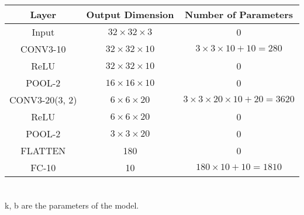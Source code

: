 \documentclass[11pt]{scrartcl} %
\begin{document}
\section{} %
\begin{table}[h]
\centering
\begin{tabular}{|c|c|c|}
\hline
Layer & Output Dimension & Number of Parameters\\
\hline
Input & $32 \times 32 \times 3$ & 0\\
\hline
CONV3-10 & $32 \times 32 \times 10$ & $3 \times 3 \times 10 + 10 = 280$\\
\hline
ReLU & $32 \times 32 \times 10$ & 0\\
\hline
POOL-2 & $16 \times 16 \times 10$ & 0\\
\hline
CONV3-20(3, 2) & $6 \times 6 \times 20$ & $3 \times 3 \times 20 \times 10 + 20 = 3620$\\
\hline
ReLU & $6 \times 6 \times 20$ & 0\\
\hline
POOL-2 & $3 \times 3 \times 20$ & 0\\
\hline
FLATTEN & 180 & 0\\
\hline
FC-10 & 10 & $180 \times 10 + 10 = 1810$\\
\hline
\end{tabular}
\end{table}
\section{} %
\subsection{} %
k, b are the parameters of the model.
\end{document}
